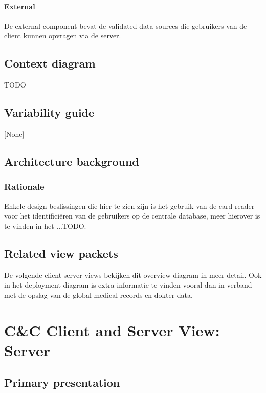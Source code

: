 \documentclass[a4paper,10pt]{book}
\begin{document}
\paragraph{External}
De external component bevat de validated data sources die gebruikers van de client kunnen opvragen via de server.



\subsection{Context diagram}
TODO

\subsection{Variability guide}
[None]

\subsection{Architecture background}

\subsubsection{Rationale}
Enkele design beslissingen die hier te zien zijn is het gebruik van de card reader voor het identifici\"{e}ren van de gebruikers op de centrale database, meer hierover is te vinden in het ...TODO.

\subsection{Related view packets}
De volgende client-server views bekijken dit overview diagram in meer detail.  Ook in het deployment diagram is extra informatie te vinden vooral dan in verband met de opslag van de global medical records en dokter data.



\section{C\&C Client and Server View: Server}
\label{Client and Server View: Server}

\subsection{Primary presentation}
\end{document}
